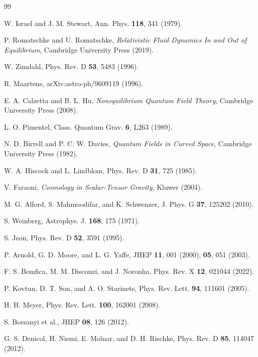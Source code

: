 \documentclass[aps,prd,reprint,superscriptaddress,floatfix]{revtex4-2}
\begin{document}
\begin{thebibliography}{99}

W. Israel and J. M. Stewart, Ann. Phys. \textbf{118}, 341 (1979).

P. Romatschke and U. Romatschke, \emph{Relativistic Fluid Dynamics In and Out of Equilibrium}, Cambridge University Press (2019).

W. Zimdahl, Phys. Rev. D \textbf{53}, 5483 (1996).

R. Maartens, arXiv:astro-ph/9609119 (1996).

E. A. Calzetta and B. L. Hu, \emph{Nonequilibrium Quantum Field Theory}, Cambridge University Press (2008).

L. O. Pimentel, Class. Quantum Grav. \textbf{6}, L263 (1989).

N. D. Birrell and P. C. W. Davies, \emph{Quantum Fields in Curved Space}, Cambridge University Press (1982).

W. A. Hiscock and L. Lindblom, Phys. Rev. D \textbf{31}, 725 (1985).

V. Faraoni, \emph{Cosmology in Scalar-Tensor Gravity}, Kluwer (2004).

M. G. Alford, S. Mahmoodifar, and K. Schwenzer, J. Phys. G \textbf{37}, 125202 (2010).

S. Weinberg, Astrophys. J. \textbf{168}, 175 (1971).

S. Jeon, Phys. Rev. D \textbf{52}, 3591 (1995).

P. Arnold, G. D. Moore, and L. G. Yaffe, JHEP \textbf{11}, 001 (2000); \textbf{05}, 051 (2003).

F. S. Bemfica, M. M. Disconzi, and J. Noronha, Phys. Rev. X \textbf{12}, 021044 (2022).

P. Kovtun, D. T. Son, and A. O. Starinets, Phys. Rev. Lett. \textbf{94}, 111601 (2005).

H. B. Meyer, Phys. Rev. Lett. \textbf{100}, 162001 (2008).

S. Borsanyi et al., JHEP \textbf{08}, 126 (2012).

G. S. Denicol, H. Niemi, E. Molnar, and D. H. Rischke, Phys. Rev. D \textbf{85}, 114047 (2012).


\end{thebibliography}
\end{document}

